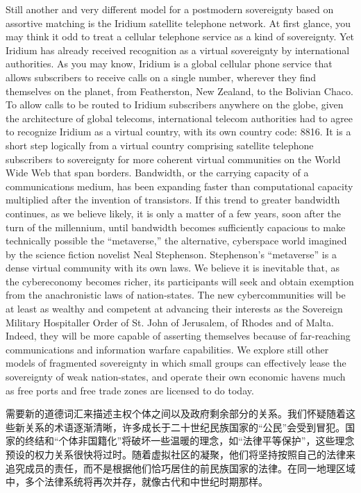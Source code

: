 \begin{paracol}{2}[]
\switchcolumn
Still another and very different model for a postmodern sovereignty based on assortive matching is the Iridium satellite telephone network. At first glance, you may think it odd to treat a cellular telephone service as a kind of sovereignty. Yet Iridium has already received recognition as a virtual sovereignty by international authorities. As you may know, Iridium is a global cellular phone service that allows subscribers to receive calls on a single number, wherever they find themselves on the planet, from Featherston, New Zealand, to the Bolivian Chaco. To allow calls to be routed to Iridium subscribers anywhere on the globe, given the architecture of global telecoms, international telecom authorities had to agree to recognize Iridium as a virtual country, with its own country code: 8816. It is a short step logically from a virtual country comprising satellite telephone subscribers to sovereignty for more coherent virtual communities on the World Wide Web that span borders. Bandwidth, or the carrying capacity of a communications medium, has been expanding faster than computational capacity multiplied after the invention of transistors. If this trend to greater bandwidth continues, as we believe likely, it is only a matter of a few years, soon after the turn of the millennium, until bandwidth becomes sufficiently capacious to make technically possible the ``metaverse,'' the alternative, cyberspace world imagined by the science fiction novelist Neal Stephenson. Stephenson's ``metaverse'' is a dense virtual community with its own laws. We believe it is inevitable that, as the cybereconomy becomes richer, its participants will seek and obtain exemption from the anachronistic laws of nation-states. The new cybercommunities will be at least as wealthy and competent at advancing their interests as the Sovereign Military Hospitaller Order of St. John of Jerusalem, of Rhodes and of Malta. Indeed, they will be more capable of asserting themselves because of far-reaching communications and information warfare capabilities. We explore still other models of fragmented sovereignty in which small groups can effectively lease the sovereignty of weak nation-states, and operate their own economic havens much as free ports and free trade zones are licensed to do today.

\switchcolumn*
需要新的道德词汇来描述主权个体之间以及政府剩余部分的关系。我们怀疑随着这些新关系的术语逐渐清晰，许多成长于二十世纪民族国家的“公民”会受到冒犯。国家的终结和“个体非国籍化”将破坏一些温暖的理念，如“法律平等保护”，这些理念预设的权力关系很快将过时。随着虚拟社区的凝聚，他们将坚持按照自己的法律来追究成员的责任，而不是根据他们恰巧居住的前民族国家的法律。在同一地理区域中，多个法律系统将再次并存，就像古代和中世纪时期那样。


\end{paracol}
